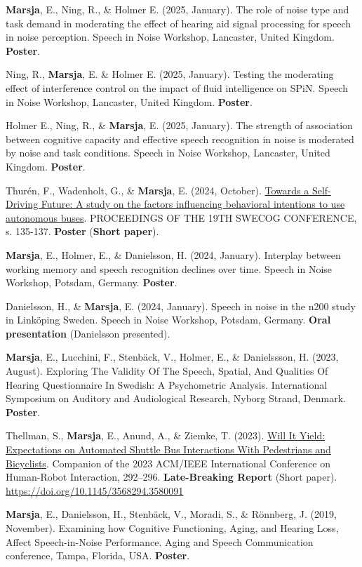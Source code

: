 \documentclass[]{article}
\begin{document}
\textbf{Marsja}, E., Ning, R., \& Holmer E. (2025, January). The role of
noise type and task demand in moderating the effect of hearing aid
signal processing for speech in noise perception. Speech in Noise
Workshop, Lancaster, United Kingdom. \textbf{Poster}.

Ning, R., \textbf{Marsja}, E. \& Holmer E. (2025, January). Testing the
moderating effect of interference control on the impact of fluid
intelligence on SPiN. Speech in Noise Workshop, Lancaster, United
Kingdom. \textbf{Poster}.

Holmer E., Ning, R., \& \textbf{Marsja}, E. (2025, January). The
strength of association between cognitive capacity and effective speech
recognition in noise is moderated by noise and task conditions. Speech
in Noise Workshop, Lancaster, United Kingdom. \textbf{Poster}.

Thurén, F., Wadenholt, G., \& \textbf{Marsja}, E. (2024, October).
\href{https://swecog.se/files/SweCog2024_Proceedings.pdf}{Towards a
Self-Driving Future: A study on the factors influencing behavioral
intentions to use autonomous buses}. PROCEEDINGS OF THE 19TH SWECOG
CONFERENCE, s. 135-137. \textbf{Poster} (\textbf{Short paper}).

\textbf{Marsja}, E., Holmer, E., \& Danielsson, H. (2024, January).
Interplay between working memory and speech recognition declines over
time. Speech in Noise Workshop, Potsdam, Germany. \textbf{Poster}.

Danielsson, H., \& \textbf{Marsja}, E. (2024, January). Speech in noise
in the n200 study in Linköping Sweden. Speech in Noise Workshop,
Potsdam, Germany. \textbf{Oral presentation} (Danielsson presented).

\textbf{Marsja}, E., Lucchini, F., Stenbäck, V., Holmer, E., \&
Danielssson, H. (2023, August). Exploring The Validity Of The Speech,
Spatial, And Qualities Of Hearing Questionnaire In Swedish: A
Psychometric Analysis. International Symposium on Auditory and
Audiological Research, Nyborg Strand, Denmark. \textbf{Poster}.

Thellman, S., \textbf{Marsja}, E., Anund, A., \& Ziemke, T. (2023).
\href{https://dl.acm.org/doi/10.1145/3568294.3580091}{Will It Yield:
Expectations on Automated Shuttle Bus Interactions With Pedestrians and
Bicyclists}. Companion of the 2023 ACM/IEEE International Conference on
Human-Robot Interaction, 292--296. \textbf{Late-Breaking Report} (Short
paper). \url{https://doi.org/10.1145/3568294.3580091}

\textbf{Marsja}, E., Danielsson, H., Stenbäck, V., Moradi, S., \&
Rönnberg, J. (2019, November). Examining how Cognitive Functioning,
Aging, and Hearing Loss, Affect Speech-in-Noise Performance. Aging and
Speech Communication conference, Tampa, Florida, USA. \textbf{Poster}.
\end{document}
